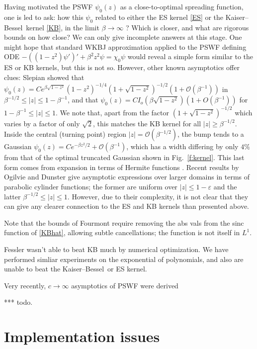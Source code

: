 \documentclass[10pt]{article}
\newcommand{\eps}{\varepsilon}
\newcommand{\bigO}{{\mathcal O}}
\newcommand{\freq}{\beta}          %
\newcommand{\KB}{Kaiser--Bessel}
\begin{document}
Having motivated the PSWF $\psi_0(z)$ as a close-to-optimal
spreading function, one is led to ask:
how this $\psi_0$ related to either the
ES kernel \eqref{ES} or the \KB\ kernel \eqref{KB},
in the limit $\freq\to\infty$ ?
Which is closer, and what are rigorous bounds on how close?
We can only give incomplete answers at this stage.
One might hope that
standard WKBJ approximation applied to the PSWF defining
ODE $-((1-z^2)\psi')'+\freq^2z^2\psi = \chi_0\psi$
would reveal a simple form similar to the ES or KB kernels,
but this is not so.
However, other known asymptotics offer clues:
Slepian \cite[(1.4)]{slepian65}
showed that $\psi_0(z) = C e^{\freq\sqrt{1-z^2}} (1-z^2)^{-1/4}
(1+\sqrt{1-z^2})^{-1/2}(1 + \bigO(\freq^{-1}))$
in $\freq^{-1/2} \le |z| \le 1-\freq^{-1}$,
and
that $\psi_0(z) = C I_o(\freq \sqrt{1-z^2}) (1 + O(\freq^{-1}))$
for $1-\freq^{-1} \le |z| \le 1$.
We note that, apart from the factor $(1+\sqrt{1-z^2})^{-1/2}$
which varies by a factor of only $\sqrt{2}$,
this matches the KB kernel for all $|z|\ge \freq^{-1/2}$.
Inside the central (turning point) region
$|z| = \bigO(\freq^{-1/2})$,
the bump tends to a Gaussian
$\psi_0(z) = C e^{-\beta z^2 /2} + \bigO(\freq^{-1})$,
which has a width differing by only $4\%$ from that of the
optimal truncated Gaussian shown in Fig.~\ref{f:kernel}.
This last form comes from expansion in terms of Hermite functions
\cite[\S 3.25]{meixner} %
\cite[Sec.~8.6]{osipov}.
Recent results by Ogilvie \cite[Sec.~4.4]{ogilvie}
and Dunster \cite{dunster}
give asymptotic expressions over larger domains
in terms of parabolic cylinder functions;
the former are uniform over $|z|\le 1-\eps$ and the
latter $\freq^{-1/2}\le|z|\le1$.
However, due to their complexity,
it is not clear that they can give
any clearer connection to the ES and KB kernels than presented above.


Note that the bounds of Fourmont require removing the abs vals
from the sinc function of \eqref{KBhat}, allowing subtle cancellations;
the function is not itself in $L^1$.

Fessler wasn't able to beat KB much by numerical optimization.
We have performed simliar experiments on the
exponential of polynomials, and also are unable to beat the \KB\ or
ES kernel.

Very recently, $c\to\infty$ asymptotics of PSWF were derived

*** todo.


\section{Implementation issues}
\end{document}
